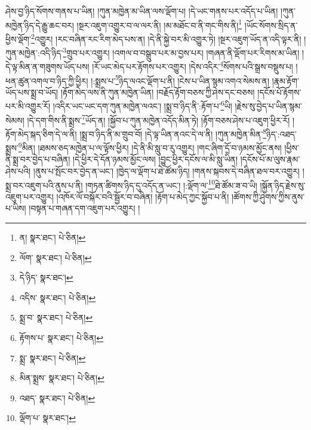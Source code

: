 ཤེས་བྱ་ཉིད་སོགས་གནས་པ་ཡིན། །ཀུན་མཁྱེན་མ་ཡིན་ལས་ལྡོག་པ། །དེ་ཡང་གནས་པར་འདོད་པ་ཡིན། །ཀུན་མཁྱེན་ཉིད་དེ་རྒྱུ་ཆང་བར། །སྔར་འཇུག་འགྱུར་བ་ལ་ལར་ནི། །མ་མཐོང་བ་ནི་གང་གིས་ནི།\footnote{ན།  སྣར་ཐང་།  པེ་ཅིན། } །ཡོང་སོགས་སྲིད་ན་ཕྱིས་ལྡོག་\footnote{ལོག་  སྣར་ཐང་།  པེ་ཅིན། }འགྱུར། །རང་བཞིན་རང་རིག་མེད་པས་ན། །དེ་ནི་སྐྱེ་བར་མི་འགྱུར་ཏེ། །སྔར་འཇུག་ཡོད་ན་འདི་ལྟར་ནི། །ཀུན་མཁྱེན་:འདི་ཉིད་\footnote{དེ་ཉིད་  སྣར་ཐང་། }གྲུབ་པར་འགྱུར། །འགལ་བ་བསྒྲུབ་པར་མ་བྱས་པར། །གཞན་ནི་ལྡོག་པར་རིགས་མ་ཡིན། །དེ་ལྟ་མིན་ན་གཟུགས་ཡོད་པས། །རོ་ཡང་མེད་པར་རྟོགས་པར་འགྱུར། །དེས་འདིར་\footnote{འདིས་  སྣར་ཐང་།  པེ་ཅིན། }སོགས་པའི་སྒྲས་བསྡུས་པ། །ཕན་ཚུན་འགལ་བ་ཉིད་ཀྱི་ཕྱིར། །:སྨྲས་པ་\footnote{སྨྲ་བ་  སྣར་ཐང་།  པེ་ཅིན། }ཉིད་ལའང་ལྡོག་པ་ནི། །ངེས་པ་ཡིན་སྙམ་འགའ་སེམས་ན། །རྣམ་རྟོག་ཡོད་པས་སྨྲ་བ་ཡོད། །རྟོག་མེད་ལས་ནི་ཀུན་མཁྱེན་ཡིན། །བརྗོད་རྟོག་བཅས་ཀྱི་ཤེས་དང་བཅས། །དངོས་པོ་རྟོགས་པར་མི་འགྱུར་རོ། །འདིར་ཡང་ཡང་དག་ཀུན་མཁྱེན་ལའང་། །སྨྲ་བ་ཉིད་ནི་:རྟོག་པ་\footnote{རྟོགས་པ་  སྣར་ཐང་།  པེ་ཅིན། }ཡི། །རྗེས་སུ་བྱེད་པ་ཡིན་སྙམ་སེམས། །དེ་དག་གིས་ནི་སྨྲས་\footnote{སྨྲ་  སྣར་ཐང་།  པེ་ཅིན། }ཡོད་ན། །སྐྱོབ་པ་ཀུན་མཁྱེན་འདོད་མིན་ཏེ། །རྟོག་བཅས་ཤེས་པ་འཇུག་ཕྱིར་རོ། །རྟོག་མེད་སྐད་ཅིག་དེ་ལ་ནི། །སྨྲ་བ་ཉིད་ནི་མ་གྲུབ་བོ། །དེ་ལྟ་ཡིན་ནའང་དེ་ལ་ནི། །ཀུན་མཁྱེན་མིན་\footnote{མིན་སྨྲས་  སྣར་ཐང་།  པེ་ཅིན། }ཉིད་:འཐད་སྨྲས་\footnote{འཐད་  སྣར་ཐང་།  པེ་ཅིན། }མིན། །ཐམས་ཅད་མཁྱེན་པ་ལ་ལྟོས་ཕྱིར། །དེ་ནི་མི་སླུ་བ་རུ་འགྱུར། །གང་ཞིག་དྲོ་བ་ཉམས་མྱོང་ནས། །ཕྱིས་ནི་སྨྲ་བར་བྱེད་པ་བཞིན། །དེ་ཕྱིར་དེ་དོན་ཉམས་མྱོང་ལས། །བྱུང་ཕྱིར་དངོས་ལ་མི་སླུ་ཡིན། །དངོས་པོ་མ་ལུས་རྣམ་ཤེས་པའི། །ནུས་པ་སྤོང་བར་བྱེད་ན་ཡང་། །ཁྱེད་ལ་ལྡོག་པ་ཐེ་ཚོམ་ཉིད། །གནས་སྐབས་དེ་བཞིན་ཐལ་བར་འགྱུར། །སྨྲ་བར་འཇུག་པའི་ནུས་པ་ནི། །གཏན་ཚིགས་ཉིད་དུ་འདོད་ན་ཡང་། །:ལྡོག་ལ་\footnote{ལྡོག་པ་  སྣར་ཐང་། }ཐེ་ཚོམ་ཟ་བ་ཡི། །སྐྱོན་ཉིད་རྗེས་སུ་འཇུག་པར་འགྱུར། །འཁོར་ལོ་བསྐོར་བའི་སྦྱོར་བ་བཞིན། །རྟོག་པ་མེད་ཀྱང་སྐྱོབ་པ་ནི། །ཚོགས་ཀྱི་ཤུགས་ཀྱིས་ནུས་པ་ཡིས། །བསྟན་པ་གཞན་དག་འཇུག་པར་འགྱུར། །
